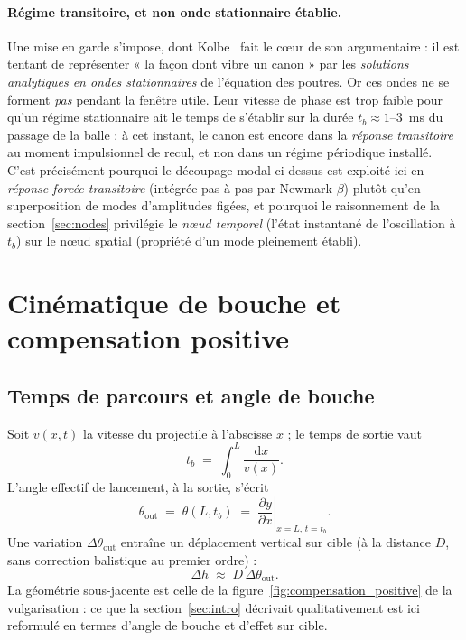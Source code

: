 \documentclass[12pt,a4paper]{article}
\begin{document}
	\paragraph{Régime transitoire, et non onde stationnaire établie.} Une mise en garde s'impose, dont Kolbe~\cite{KolbeSim} fait le c\oe ur de son argumentaire : il est tentant de représenter « la façon dont vibre un canon » par les \emph{solutions analytiques en ondes stationnaires} de l'équation des poutres. Or ces ondes ne se forment \emph{pas} pendant la fenêtre utile. Leur vitesse de phase est trop faible pour qu'un régime stationnaire ait le temps de s'établir sur la durée $t_b \approx 1$--$3$~ms du passage de la balle : à cet instant, le canon est encore dans la \emph{réponse transitoire} au moment impulsionnel de recul, et non dans un régime périodique installé. C'est précisément pourquoi le découpage modal ci-dessus est exploité ici en \emph{réponse forcée transitoire} (intégrée pas à pas par Newmark-$\beta$) plutôt qu'en superposition de modes d'amplitudes figées, et pourquoi le raisonnement de la section~\ref{sec:nodes} privilégie le \emph{n\oe ud temporel} (l'état instantané de l'oscillation à $t_b$) sur le n\oe ud spatial (propriété d'un mode pleinement établi).

	\section{Cinématique de bouche et compensation positive}
	\label{sec:cinematique}

	\subsection{Temps de parcours et angle de bouche}

	Soit $v(x,t)$ la vitesse du projectile à l'abscisse $x$ ; le temps de sortie vaut
	\begin{equation}
		t_b \;=\; \int_0^L \frac{\mathrm{d}x}{v(x)}.
	\end{equation}
	L'angle effectif de lancement, à la sortie, s'écrit
	\begin{equation}
		\theta_\text{out} \;=\; \theta(L, t_b) \;=\; \left.\frac{\partial y}{\partial x}\right|_{x=L,\,t=t_b}.
	\end{equation}
	Une variation $\Delta \theta_\text{out}$ entraîne un déplacement vertical sur cible (à la distance $D$, sans correction balistique au premier ordre) :
	\begin{equation}
		\Delta h \;\approx\; D\,\Delta \theta_\text{out}.
	\end{equation}
	La géométrie sous-jacente est celle de la figure~\ref{fig:compensation_positive} de la vulgarisation : ce que la section~\ref{sec:intro} décrivait qualitativement est ici reformulé en termes d'angle de bouche et d'effet sur cible.
\end{document}
